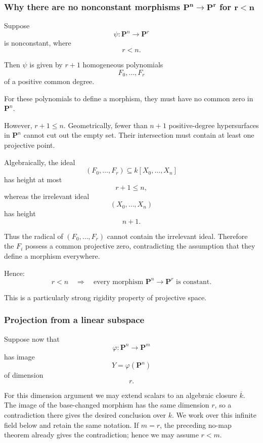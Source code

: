 \subsubsection{Why there are no nonconstant morphisms \(\boldsymbol{\mathbf{P}^n\to\mathbf{P}^r}\) for \(\boldsymbol{r<n}\)}

Suppose
\[
\psi:\mathbf{P}^n\longrightarrow\mathbf{P}^r
\]
is nonconstant, where
\[
r<n.
\]

Then \(\psi\) is given by \(r+1\) homogeneous polynomials
\[
F_0,\dots,F_r
\]
of a positive common degree.

For these polynomials to define a morphism, they must have no common zero in \(\mathbf{P}^n\).

However, \(r+1\leq n\). Geometrically, fewer than \(n+1\) positive-degree hypersurfaces in \(\mathbf{P}^n\) cannot cut out the empty set. Their intersection must contain at least one projective point.

Algebraically, the ideal
\[
(F_0,\dots,F_r)
\subseteq
k[X_0,\dots,X_n]
\]
has height at most
\[
r+1\leq n,
\]
whereas the irrelevant ideal
\[
(X_0,\dots,X_n)
\]
has height
\[
n+1.
\]

Thus the radical of \((F_0,\dots,F_r)\) cannot contain the irrelevant ideal. Therefore the \(F_i\) possess a common projective zero, contradicting the assumption that they define a morphism everywhere.

Hence:
\[
\boxed{
	r<n
	\quad\Longrightarrow\quad
	\text{every morphism }\mathbf{P}^n\longrightarrow\mathbf{P}^r
	\text{ is constant.}
}
\]

This is a particularly strong rigidity property of projective space.

\subsubsection{Projection from a linear subspace}

Suppose now that
\[
\varphi:\mathbf{P}^n\longrightarrow\mathbf{P}^m
\]
has image
\[
Y=\varphi(\mathbf{P}^n)
\]
of dimension
\[
r.
\]

For this dimension argument we may extend scalars to an algebraic
closure \(\overline{k}\). The image of the base-changed morphism has
the same dimension \(r\), so a contradiction there gives the desired
conclusion over \(k\). We work over this infinite field below and
retain the same notation. If \(m=r\), the preceding no-map theorem
already gives the contradiction; hence we may assume \(r<m\).

